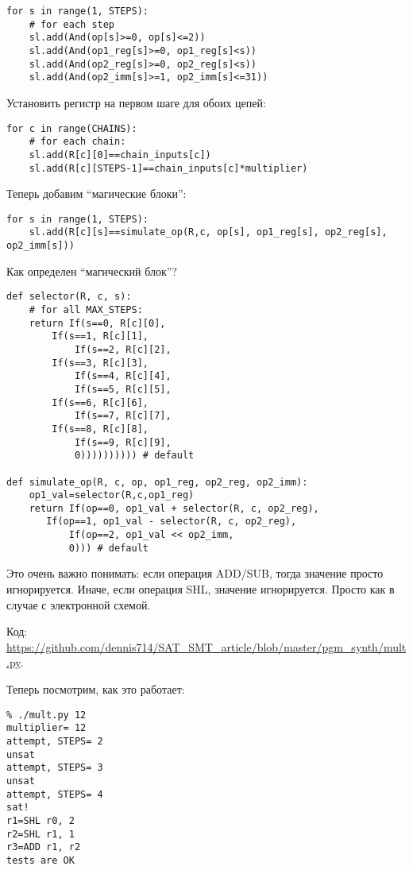 \begin{lstlisting}
for s in range(1, STEPS):
    # for each step
    sl.add(And(op[s]>=0, op[s]<=2))
    sl.add(And(op1_reg[s]>=0, op1_reg[s]<s))
    sl.add(And(op2_reg[s]>=0, op2_reg[s]<s))
    sl.add(And(op2_imm[s]>=1, op2_imm[s]<=31))
\end{lstlisting}

Установить регистр на первом шаге для обоих цепей:

\begin{lstlisting}
for c in range(CHAINS):
    # for each chain:
    sl.add(R[c][0]==chain_inputs[c])
    sl.add(R[c][STEPS-1]==chain_inputs[c]*multiplier)
\end{lstlisting}

Теперь добавим ``магические блоки'':

\begin{lstlisting}
for s in range(1, STEPS):
    sl.add(R[c][s]==simulate_op(R,c, op[s], op1_reg[s], op2_reg[s], op2_imm[s]))
\end{lstlisting}

Как определен ``магический блок''?

\begin{lstlisting}
def selector(R, c, s):
    # for all MAX_STEPS:
    return If(s==0, R[c][0],
	    If(s==1, R[c][1],
            If(s==2, R[c][2],
	    If(s==3, R[c][3],
            If(s==4, R[c][4],
            If(s==5, R[c][5],
	    If(s==6, R[c][6],
            If(s==7, R[c][7],
	    If(s==8, R[c][8],
            If(s==9, R[c][9],
	        0)))))))))) # default

def simulate_op(R, c, op, op1_reg, op2_reg, op2_imm):
    op1_val=selector(R,c,op1_reg)
    return If(op==0, op1_val + selector(R, c, op2_reg),
	   If(op==1, op1_val - selector(R, c, op2_reg),
           If(op==2, op1_val << op2_imm,
	       0))) # default
\end{lstlisting}

Это очень важно понимать: если операция ADD/SUB, тогда значение  просто игнорируется.
Иначе, если операция SHL, значение  игнорируется.
Просто как в случае с электронной схемой.

Код: \url{https://github.com/dennis714/SAT_SMT_article/blob/master/pgm_synth/mult.py}.

Теперь посмотрим, как это работает:

\begin{lstlisting}
% ./mult.py 12
multiplier= 12
attempt, STEPS= 2
unsat
attempt, STEPS= 3
unsat
attempt, STEPS= 4
sat!
r1=SHL r0, 2
r2=SHL r1, 1
r3=ADD r1, r2
tests are OK
\end{lstlisting}

